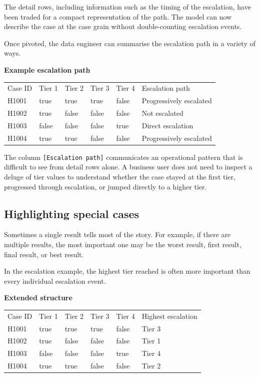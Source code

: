 \documentclass[10pt,openany,10pt]{book}
\newcounter{none}
\let\podeToprule\toprule
\let\podeMidrule\midrule
\let\podeBottomrule\bottomrule
\renewcommand{\toprule}{\arrayrulecolor{pbiGrid}\podeToprule}
\renewcommand{\midrule}{\arrayrulecolor{pbiGrid}\podeMidrule}
\renewcommand{\bottomrule}{\arrayrulecolor{pbiGrid}\podeBottomrule}
\begin{document}
The detail rows, including information such as the timing of the
escalation, have been traded for a compact representation of the path.
The model can now describe the case at the case grain without
double-counting escalation events.

Once pivoted, the data engineer can summarise the escalation path in a
variety of ways.

\textbf{Example escalation path}

{\def\LTcaptype{none} %
\begin{longtable}[]{@{}llllll@{}}
\toprule\noalign{}
Case ID & Tier 1 & Tier 2 & Tier 3 & Tier 4 & Escalation path \\
\midrule\noalign{}
\endhead
\bottomrule\noalign{}
\endlastfoot
H1001 & true & true & true & false & Progressively escalated \\
H1002 & true & false & false & false & Not escalated \\
H1003 & false & false & false & true & Direct escalation \\
H1004 & true & true & false & false & Progressively escalated \\
\end{longtable}
}

The column \texttt{{[}Escalation\ path{]}} communicates an operational
pattern that is difficult to see from detail rows alone. A business user
does not need to inspect a deluge of tier values to understand whether
the case stayed at the first tier, progressed through escalation, or
jumped directly to a higher tier.

\subsection{Highlighting special
cases}\label{highlighting-special-cases}

Sometimes a single result tells most of the story. For example, if there
are multiple results, the most important one may be the worst result,
first result, final result, or best result.

In the escalation example, the highest tier reached is often more
important than every individual escalation event.

\textbf{Extended structure}

{\def\LTcaptype{none} %
\begin{longtable}[]{@{}llllll@{}}
\toprule\noalign{}
Case ID & Tier 1 & Tier 2 & Tier 3 & Tier 4 & Highest escalation \\
\midrule\noalign{}
\endhead
\bottomrule\noalign{}
\endlastfoot
H1001 & true & true & true & false & Tier 3 \\
H1002 & true & false & false & false & Tier 1 \\
H1003 & false & false & false & true & Tier 4 \\
H1004 & true & true & false & false & Tier 2 \\
\end{longtable}
}
\end{document}
